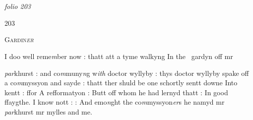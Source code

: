 \documentclass[12pt, a4paper]{book}
\begin{document}
\dotfill
						  \section*{}  \subsection*{}

\textit{folio 203}



\begin{flushright}{\color{Mahogany}203}\end{flushright}

				\begin{center} \begin{large} {\scshape Gardin\textit{er}} \end{large} \end{center}
			
            		
            		
            			
				\marginpar[\vspace{0.5cm}{\textcolor{Gray}{D. willoughby}}]{}
			
            		
				\marginpar[\vspace{0.5cm}{\textcolor{Gray}{m}}]{}
			
            		
		\ifthenelse{\isodd{\thepage}}
		{\reversemarginpar}
		{\normalmarginpar}
		I doo well reme\textit{m}ber now : thatt att a tyme walkyng In the 
            			gardyn off mr 
			
            		\textit{par}khurst : and co\textit{m}muny\textit{n}g w\textit{ith} doctor wyllyby : thys
            		 doctor wyllyby spake off a co\textit{m}myssyon and sayde : thatt ther
shuld be one schortly sentt downe Into kentt : ffor
A refformatyon : Butt off whom he had lernyd thatt : In 
good ffaygthe. I know nott : : And emo\textit{n}ght the 
            			co\textit{m}myssyon\textit{er}s he namyd mr \textit{par}khurst mr mylles and me.
            		
            		
            		
            			
				\marginpar[\vspace{0.5cm}{\textcolor{Gray}{mr Baker}}]{}
			
            			
				\marginpar[\vspace{0.5cm}{\textcolor{Gray}{m}}]{}
			
\end{document}
